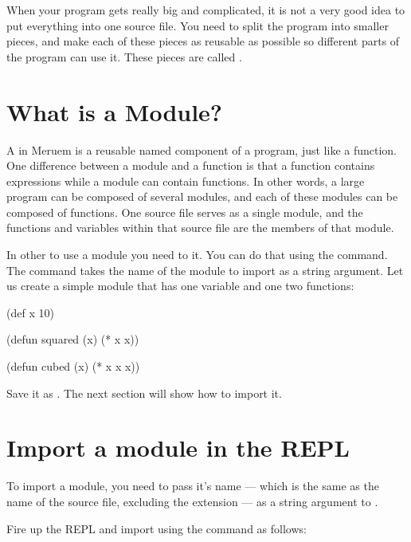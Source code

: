 When your program gets really big and complicated, it is not a very good idea to put everything into one source file. You need to split the program into smaller pieces, and make each of these pieces as reusable as possible so different parts of the program can use it. These pieces are called .

\section{What is a Module?}
A  in Meruem is a reusable named component of a program, just like a function. One difference between a module and a function is that a function contains expressions while a module can contain functions. In other words, a large program can be composed of several modules, and each of these modules can be composed of functions. One source file serves as a single module, and the functions and variables within that source file are the members of that module. 

In other to use a module you need to  it. You can do that using the  command. The  command takes the name of the module to import as a string argument. Let us create a simple module that has one variable and one two functions:

\begin{Meruem}
(def x 10)

(defun squared (x) (* x x))

(defun cubed (x) (* x x x))
\end{Meruem}

Save it as . The next section will show how to import it.

\section{Import a module in the REPL}
To import a module, you need to pass it's name --- which is the same as the name of the source file, excluding the  extension --- as a string argument to . 

Fire up the REPL and import  using the  command as follows:

\begin{REPL}
meruem> (import "module_demo")
SomeModule(module_demo, MutableList(/home/melvic/meruem/lib/prelude), ArrayBuffer(cubed, module, x, squared)})
\end{REPL}

